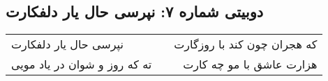 \begin{center}
\section*{دوبیتی شماره ۷: نپرسی حال یار دلفکارت}
\label{sec:007}
\begin{longtable}{l p{0.5cm} r}
نپرسی حال یار دلفکارت
&&
که هجران چون کند با روزگارت
\\
ته که روز و شوان در یاد مویی
&&
هزارت عاشق با مو چه کارت
\\
\end{longtable}
\end{center}

